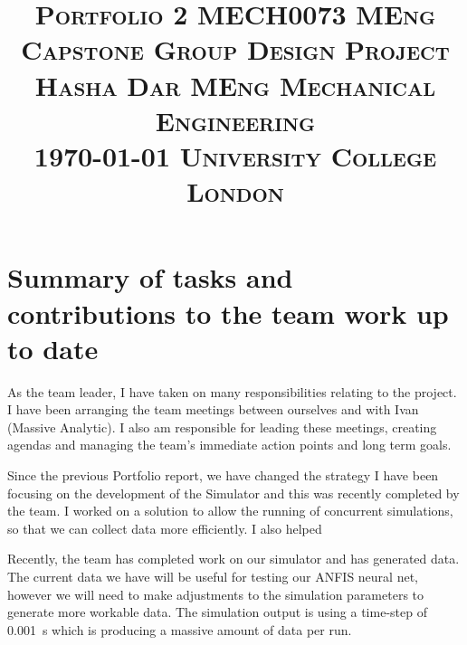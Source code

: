 \documentclass[11pt]{article}
\title{
    \textsc{\huge Portfolio 2 }\hfill \textsc{\large MECH0073 MEng Capstone Group Design Project}\\%
    \textsc{\large Hasha Dar} \hfill \textsc{\large MEng Mechanical Engineering }\\
    \textsc{\large \today} \hfill \textsc{\large University College London }
}
\date{}
\begin{document}
\maketitle
\section{Summary of tasks and contributions to the team work up to date}
As the team leader, I have taken on many responsibilities relating to the project. I have been arranging the team meetings between ourselves and with Ivan (Massive Analytic). I also am responsible for leading these meetings, creating agendas and managing the team's immediate action points and long term goals.

Since the previous Portfolio report, we have changed the strategy I have been focusing on the development of the Simulator and this was recently completed by the team. I worked on a solution to allow the running of concurrent simulations, so that we can collect data more efficiently. I also helped

Recently, the team has completed work on our simulator and has generated data. The current data we have will be useful for testing our ANFIS neural net, however we will need to make adjustments to the simulation parameters to generate more workable data. The simulation output is using a time-step of \SI{0.001}{\second} which is producing a massive amount of data per run.
\end{document}
